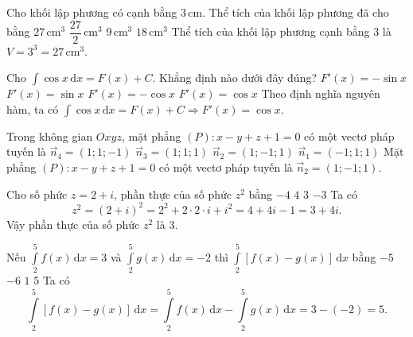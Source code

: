 \begin{ex}%
Cho khối lập phương có cạnh bằng $3\,\text{cm}$. Thể tích của khối lập phương đã cho bằng
\choice
{\True $27\,\text{cm}^3$}
{$\dfrac{27}{2}\,\text{cm}^3$}
{$9\,\text{cm}^3$}
{$18\,\text{cm}^3$}
\loigiai
{Thể tích của khối lập phương cạnh bằng $3$ là $V=3^3=27\,\text{cm}^3$.
}
\end{ex}

\begin{ex}%
Cho $\displaystyle\int\cos x\mathrm{\,d}x=F(x)+C$. Khẳng định nào dưới đây đúng?
\choice
{$F'(x)=-\sin x$}
{$F'(x)=\sin x$}
{$F'(x)=-\cos x$}
{\True $F'(x)=\cos x$}
\loigiai
{Theo định nghĩa nguyên hàm, ta có $\displaystyle\int\cos x\mathrm{\,d}x=F(x)+C\Rightarrow F'(x)=\cos x$.
}
\end{ex}

\begin{ex}%
Trong không gian $Oxyz$, mặt phẳng $(P)\colon x-y+z+1=0$ có một vectơ pháp tuyến là
\choice
{$\overrightarrow{n}_4=(1;1;-1)$}
{$\overrightarrow{n}_3=(1;1;1)$}
{\True $\overrightarrow{n}_2=(1;-1;1)$}
{$\overrightarrow{n}_1=(-1;1;1)$}
\loigiai
{Mặt phẳng $(P)\colon x-y+z+1=0$ có một vectơ pháp tuyến là $\overrightarrow{n}_2=(1;-1;1)$.
}
\end{ex}

\begin{ex}%
Cho số phức $z=2+i$, phần thực của số phức $z^2$ bằng
\choice
{$-4$}
{$4$}
{\True $3$}
{$-3$}
\loigiai
{Ta có 
\[z^2=(2+i)^2=2^2+2\cdot 2\cdot i+i^2=4+4i-1=3+4i.\]
Vậy phần thực của số phức $z^2$ là 3.
}
\end{ex}

\begin{ex}%
Nếu $\displaystyle\int\limits_2^5 f(x)\mathrm{\,d}x=3$ và $\displaystyle\int\limits_2^5 g(x)\mathrm{\,d}x=-2$ thì $\displaystyle\int\limits_2^5 [f(x)-g(x)]\mathrm{\,d}x$ bằng
\choice
{$-5$}
{$-6$}
{$1$}
{\True $5$}
\loigiai
{Ta có \[\displaystyle\int\limits_2^5 [f(x)-g(x)]\mathrm{\,d}x=\displaystyle\int\limits_2^5 f(x)\mathrm{\,d}x-\displaystyle\int\limits_2^5 g(x)\mathrm{\,d}x=3-(-2)=5.\]
}
\end{ex}

